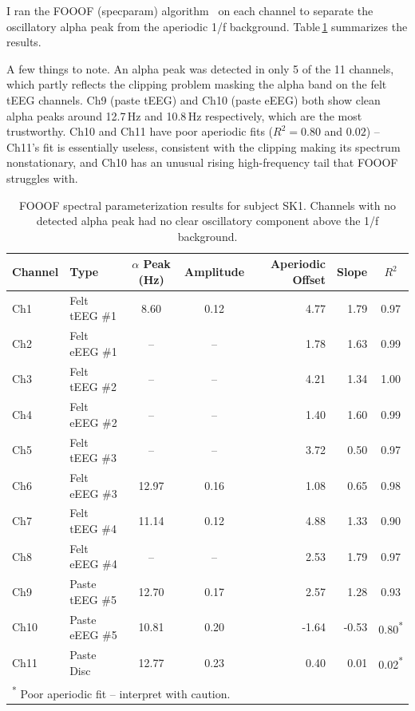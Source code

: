 \documentclass[10pt,conference]{IEEEtran}
\begin{document}
I ran the FOOOF (specparam) algorithm~\cite{donoghue2020} on each channel to separate the
oscillatory alpha peak from the aperiodic 1/f background.
Table\,\ref{tab:fooof} summarizes the results.

A few things to note.
An alpha peak was detected in only 5 of the 11 channels, which partly
reflects the clipping problem masking the alpha band on the felt tEEG
channels.
Ch9 (paste tEEG) and Ch10 (paste eEEG) both show clean alpha peaks around
12.7\,Hz and 10.8\,Hz respectively, which are the most trustworthy.
Ch10 and Ch11 have poor aperiodic fits ($R^{2} = 0.80$ and $0.02$) --
Ch11's fit is essentially useless, consistent with the clipping making its
spectrum nonstationary, and Ch10 has an unusual rising high-frequency tail
that FOOOF struggles with.

\begin{table}[t]
  \centering
  \caption{FOOOF spectral parameterization results for subject SK1.
    Channels with no detected alpha peak had no clear oscillatory
    component above the 1/f background.}
  \label{tab:fooof}
  \renewcommand{\arraystretch}{1.2}
  \begin{tabular}{llccrrc}
    \toprule
    \textbf{Channel} & \textbf{Type} &
    \textbf{$\alpha$ Peak (Hz)} & \textbf{Amplitude} &
    \textbf{Aperiodic Offset} & \textbf{Slope} &
    \textbf{$R^{2}$} \\
    \midrule
    Ch1  & Felt tEEG \#1  &  8.60 & 0.12 &  4.77 &  1.79 & 0.97 \\
    Ch2  & Felt eEEG \#1  & --    & --   &  1.78 &  1.63 & 0.99 \\
    Ch3  & Felt tEEG \#2  & --    & --   &  4.21 &  1.34 & 1.00 \\
    Ch4  & Felt eEEG \#2  & --    & --   &  1.40 &  1.60 & 0.99 \\
    Ch5  & Felt tEEG \#3  & --    & --   &  3.72 &  0.50 & 0.97 \\
    Ch6  & Felt eEEG \#3  & 12.97 & 0.16 &  1.08 &  0.65 & 0.98 \\
    Ch7  & Felt tEEG \#4  & 11.14 & 0.12 &  4.88 &  1.33 & 0.90 \\
    Ch8  & Felt eEEG \#4  & --    & --   &  2.53 &  1.79 & 0.97 \\
    Ch9  & Paste tEEG \#5 & 12.70 & 0.17 &  2.57 &  1.28 & 0.93 \\
    Ch10 & Paste eEEG \#5 & 10.81 & 0.20 & -1.64 & -0.53 & 0.80\textsuperscript{*} \\
    Ch11 & Paste Disc     & 12.77 & 0.23 &  0.40 &  0.01 & 0.02\textsuperscript{*} \\
    \bottomrule
    \multicolumn{7}{l}{\small \textsuperscript{*} Poor aperiodic fit -- interpret with caution.}
  \end{tabular}
\end{table}
\end{document}
